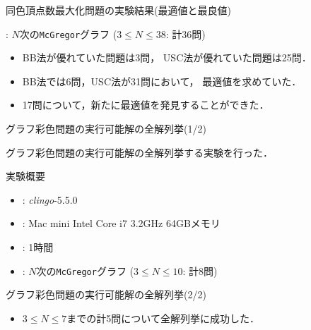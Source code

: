 \documentclass[dvipdfmx,11pt]{beamer}
\newcommand{\code}[1]{\lstinline[basicstyle=\ttfamily]{#1}}
\begin{document}
\begin{frame}[noframenumbering]{同色頂点数最大化問題の実験結果(最適値と最良値)}
 \thispagestyle{empty}
 \begin{block}{}
  : $N$次の\code{McGregor}グラフ ($3 \leq N\leq 38$: 計36問)
 \end{block}
 

 \begin{center}
  \begin{table}[tb]\scriptsize
   
  \end{table}
 \end{center}


 \begin{itemize}
  \item BB法が優れていた問題は3問，
        USC法が優れていた問題は25問．
  \item BB法では6問，USC法が31問において，
	最適値を求めていた．
  \item 17問について，新たに最適値を発見することができた．
 \end{itemize}
\end{frame}
\begin{frame}[noframenumbering]{グラフ彩色問題の実行可能解の全解列挙(1/2)}
 \thispagestyle{empty}

 \begin{block}{}
  グラフ彩色問題の実行可能解の全解列挙する実験を行った．  
 \end{block}

 \begin{block}{実験概要}
  \begin{itemize}
   \item {}: \textit{clingo}-5.5.0
   \item {}: Mac mini Intel Core i7 3.2GHz 64GBメモリ
   \item {}: 1時間
   \item {}: $N$次の\code{McGregor}グラフ ($3 \leq N\leq 10$: 計8問)
  \end{itemize}
 \end{block}
\end{frame}

\begin{frame}[noframenumbering]{グラフ彩色問題の実行可能解の全解列挙(2/2)}
 \thispagestyle{empty}

 \begin{center}
  
 \end{center}

 \begin{itemize}
  \item $3 \leq N\leq 7$までの計5問について全解列挙に成功した．
 \end{itemize}
\end{frame}

\end{document}
